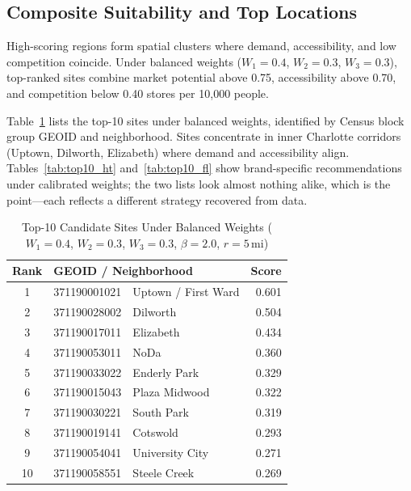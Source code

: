 \documentclass[conference]{IEEEtran}
\begin{document}
\subsection{Composite Suitability and Top Locations}

High-scoring regions form spatial clusters where demand,
accessibility, and low competition coincide. Under balanced weights
($W_1 = 0.4$, $W_2 = 0.3$, $W_3 = 0.3$), top-ranked sites combine
market potential above 0.75, accessibility above 0.70, and competition
below 0.40 stores per 10{,}000 people.

Table~\ref{tab:top10_scores} lists the top-10 sites under balanced
weights, identified by Census block group GEOID and neighborhood.
Sites concentrate in inner Charlotte corridors (Uptown, Dilworth,
Elizabeth) where demand and accessibility align. Tables~\ref{tab:top10_ht}
and~\ref{tab:top10_fl} show brand-specific recommendations under
calibrated weights; the two lists look almost nothing alike, which
is the point---each reflects a different strategy recovered from data.

\begin{table}[!t]
\centering
\caption{Top-10 Candidate Sites Under Balanced Weights
         ($W_1=0.4$, $W_2=0.3$, $W_3=0.3$, $\beta=2.0$, $r=5$\,mi)}
\label{tab:top10_scores}
\begin{tabular}{clr}
\toprule
\textbf{Rank} & \textbf{GEOID / Neighborhood} & \textbf{Score} \\
\midrule
1  & 371190001021\ \ Uptown / First Ward    & 0.601 \\
2  & 371190028002\ \ Dilworth               & 0.504 \\
3  & 371190017011\ \ Elizabeth              & 0.434 \\
4  & 371190053011\ \ NoDa                   & 0.360 \\
5  & 371190033022\ \ Enderly Park           & 0.329 \\
6  & 371190015043\ \ Plaza Midwood          & 0.322 \\
7  & 371190030221\ \ South Park             & 0.319 \\
8  & 371190019141\ \ Cotswold               & 0.293 \\
9  & 371190054041\ \ University City        & 0.271 \\
10 & 371190058551\ \ Steele Creek           & 0.269 \\
\bottomrule
\end{tabular}
\end{table}
\end{document}
